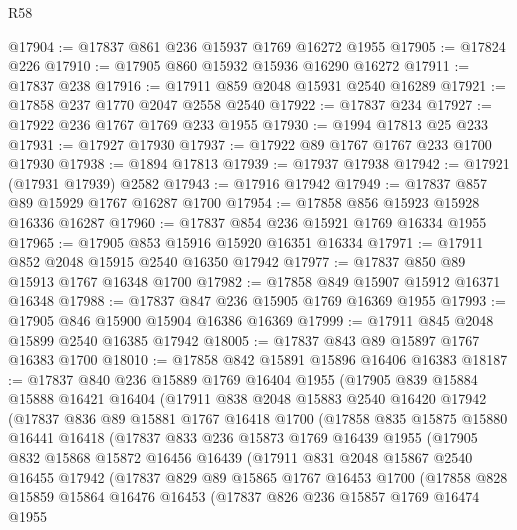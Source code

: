 \begin{lexlean}{R58}
\begin{coremodule}
@17904 := @17837 @861 @236 @15937 @1769 @16272 @1955
@17905 := @17824 @226
@17910 := @17905 @860 @15932 @15936 @16290 @16272
@17911 := @17837 @238
@17916 := @17911 @859 @2048 @15931 @2540 @16289
@17921 := @17858 @237 @1770 @2047 @2558 @2540
@17922 := @17837 @234
@17927 := @17922 @236 @1767 @1769 @233 @1955
@17930 := @1994 @17813 @25 @233
@17931 := @17927 @17930
@17937 := @17922 @89 @1767 @1767 @233 @1700 @17930
@17938 := @1894 @17813
@17939 := @17937 @17938
@17942 := @17921 (@17931 @17939) @2582
@17943 := @17916 @17942
@17949 := @17837 @857 @89 @15929 @1767 @16287 @1700
@17954 := @17858 @856 @15923 @15928 @16336 @16287
@17960 := @17837 @854 @236 @15921 @1769 @16334 @1955
@17965 := @17905 @853 @15916 @15920 @16351 @16334
@17971 := @17911 @852 @2048 @15915 @2540 @16350 @17942
@17977 := @17837 @850 @89 @15913 @1767 @16348 @1700
@17982 := @17858 @849 @15907 @15912 @16371 @16348
@17988 := @17837 @847 @236 @15905 @1769 @16369 @1955
@17993 := @17905 @846 @15900 @15904 @16386 @16369
@17999 := @17911 @845 @2048 @15899 @2540 @16385 @17942
@18005 := @17837 @843 @89 @15897 @1767 @16383 @1700
@18010 := @17858 @842 @15891 @15896 @16406 @16383
@18187 := @17837
    @840
    @236
    @15889
    @1769
    @16404
    @1955
    (@17905
      @839
      @15884
      @15888
      @16421
      @16404
      (@17911
        @838
        @2048
        @15883
        @2540
        @16420
        @17942
        (@17837
          @836
          @89
          @15881
          @1767
          @16418
          @1700
          (@17858
            @835
            @15875
            @15880
            @16441
            @16418
            (@17837
              @833
              @236
              @15873
              @1769
              @16439
              @1955
              (@17905
                @832
                @15868
                @15872
                @16456
                @16439
                (@17911
                  @831
                  @2048
                  @15867
                  @2540
                  @16455
                  @17942
                  (@17837
                    @829
                    @89
                    @15865
                    @1767
                    @16453
                    @1700
                    (@17858
                      @828
                      @15859
                      @15864
                      @16476
                      @16453
                      (@17837
                        @826
                        @236
                        @15857
                        @1769
                        @16474
                        @1955

\end{coremodule}
\end{lexlean}
